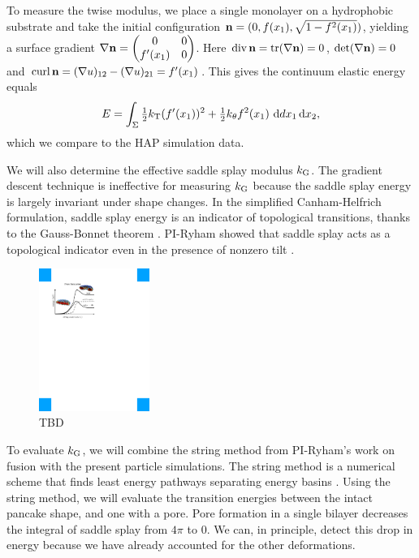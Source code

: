 To measure the twise modulus, we place a single monolayer on a hydrophobic substrate 
and take the initial configuration ${\bf n} = (0, f(x_1), \sqrt{1 - f^2(x_1)})$,
yielding a surface gradient $\nabla {\bf n} = \begin{pmatrix}0 & 0\\ f'(x_1) & 0\end{pmatrix}$. 
  Here $\operatorname{div} {\bf n} = \mathrm{tr}(\nabla {\bf n}) = 0$, $\det(\nabla {\bf n}) = 0$ and
  $\operatorname{curl} {\bf n} = (\nabla u)_{12} - (\nabla u)_{21} = f'(x_1)$.
  This gives the continuum elastic energy equals
  \begin{equation}
    \label{eq:twist_energy}
    E = \int_{\Sigma} \tfrac{1}{2}\KT (f'(x_1))^2 + \tfrac{1}{2} \KTH f^2(x_1) \,\dif dx_1 \dif x_2,
  \end{equation}
  which we compare to the HAP simulation data.

We will also determine the effective saddle splay modulus $k_{\mathrm{G}}$. 
The gradient descent technique is ineffective for measuring $k_{\mathrm{G}}$ because
the saddle splay energy is largely invariant under shape changes.
In the simplified Canham-Helfrich formulation, saddle splay energy is an indicator of topological transitions, thanks to the  Gauss-Bonnet theorem
\cite{TerziDeserno17}.
PI-Ryham showed that saddle splay acts as a topological indicator even in the presence of nonzero tilt \cite{RyKlYaCo16}. 

\begin{figure}
\centerline{\includegraphics[width=0.32\textwidth]{Figures/SaddleSplayDiagram.pdf}}
\caption{
\label{fig:saddle_splay}  
 TBD
}
\end{figure}
To evaluate $k_{\mathrm{G}}$, we will combine the string method from PI-Ryham's work on fusion \cite{RyKlYaCo16} with
the present particle simulations. The string method is a numerical scheme that finds
least energy pathways separating energy basins \cite{doi:10.1063/1.2720838}.
Using the string method, we will evaluate the transition energies between the intact pancake shape,
and one with a pore. Pore formation in a single bilayer decreases the integral of saddle splay from $4\pi$
to $0$. We can, in principle, detect this drop in energy because we have already accounted for the other deformations. 

